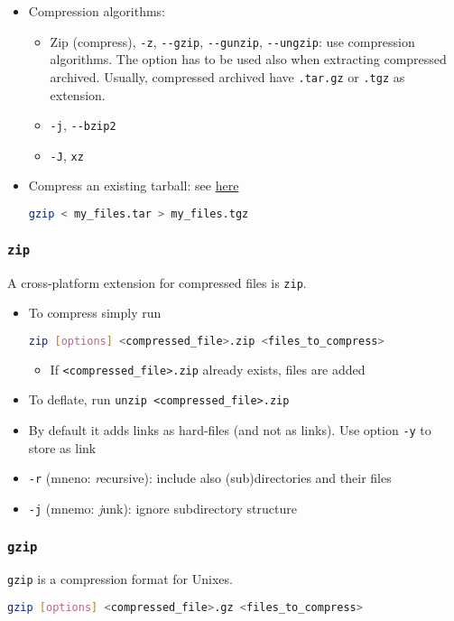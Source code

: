 \documentclass[a4paper,12pt,%
              final%
              ]{article}
\begin{document}
\begin{itemize}
\begin{itemize}
    \end{itemize}
  \item Compression algorithms:
    \begin{itemize}
      \item Zip (compress), \verb|-z|, \verb|--gzip|, \verb|--gunzip|, \verb|--ungzip|: use compression algorithms. The option has to be used also when extracting compressed archived. Usually, compressed archived have \verb|.tar.gz| or \verb|.tgz| as extension.
      \item \verb|-j|, \verb|--bzip2|
      \item \verb|-J|, \verb|xz|
    \end{itemize}
  \item Compress an existing tarball: see \href{https://unix.stackexchange.com/questions/457949/how-to-turn-a-tar-file-to-a-tgz-file}{here}
\begin{lstlisting}[language=bash]
gzip < my_files.tar > my_files.tgz
\end{lstlisting}
\end{itemize}

\subsubsection{\texttt{zip}}
A cross-platform extension for compressed files is \texttt{zip}.
\begin{itemize}
  \item To compress simply run
\begin{lstlisting}[language=bash]
zip [options] <compressed_file>.zip <files_to_compress>
\end{lstlisting}
    \begin{itemize}
      \item If \verb|<compressed_file>.zip| already exists, files are added
    \end{itemize}
  \item To deflate, run \verb|unzip <compressed_file>.zip|
  \item By default it adds links as hard-files (and not as links). Use option \verb|-y| to store as link
  \item \verb|-r| (mneno: \emph{r}ecursive): include also (sub)directories and their files
  \item \verb|-j| (mnemo: \emph{j}unk): ignore subdirectory structure
\end{itemize}

\subsubsection{\texttt{gzip}}
\texttt{gzip} is a compression format for Unixes.
\begin{lstlisting}[language=bash]
gzip [options] <compressed_file>.gz <files_to_compress>
\end{lstlisting}
\end{document}
